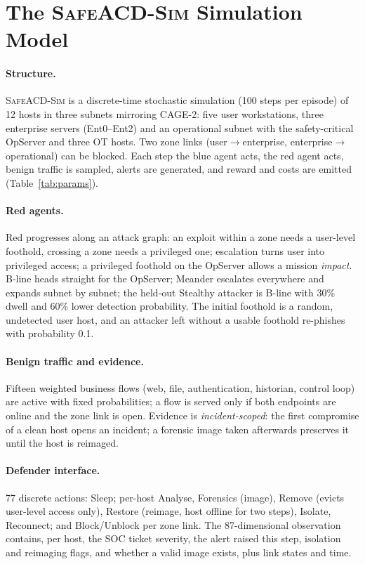 \documentclass[10pt]{article}
\newcommand{\safeacd}{\textsc{SafeACD-Sim}}
\begin{document}
\section{The \safeacd{} Simulation Model}
\paragraph{Structure.}
\safeacd{} is a discrete-time stochastic simulation (100 steps per episode)
of 12 hosts in three subnets mirroring CAGE-2: five user workstations, three
enterprise servers (Ent0--Ent2) and an operational subnet with the
safety-critical OpServer and three OT hosts. Two zone links (user$\to$enterprise,
enterprise$\to$operational) can be blocked. Each step the blue agent acts,
the red agent acts, benign traffic is sampled, alerts are generated, and
reward and costs are emitted (Table~\ref{tab:params}).

\paragraph{Red agents.}
Red progresses along an attack graph: an exploit within a zone needs a
user-level foothold, crossing a zone needs a privileged one; escalation turns
user into privileged access; a privileged foothold on the OpServer allows a
mission \emph{impact}. \textsf{B-line} heads straight for the OpServer;
\textsf{Meander} escalates everywhere and expands subnet by subnet; the
held-out \textsf{Stealthy} attacker is B-line with 30\% dwell and 60\% lower
detection probability. The initial foothold is a random, undetected user host,
and an attacker left without a usable foothold re-phishes with probability 0.1.

\paragraph{Benign traffic and evidence.}
Fifteen weighted business flows (web, file, authentication, historian, control
loop) are active with fixed probabilities; a flow is served only if both
endpoints are online and the zone link is open. Evidence is
\emph{incident-scoped}: the first compromise of a clean host opens an incident;
a forensic image taken afterwards preserves it until the host is reimaged.

\paragraph{Defender interface.}
77 discrete actions: \textsf{Sleep}; per-host \textsf{Analyse},
\textsf{Forensics} (image), \textsf{Remove} (evicts user-level access only),
\textsf{Restore} (reimage, host offline for two steps), \textsf{Isolate},
\textsf{Reconnect}; and \textsf{Block}/\textsf{Unblock} per zone link. The
87-dimensional observation contains, per host, the SOC ticket severity, the
alert raised this step, isolation and reimaging flags, and whether a valid
image exists, plus link states and time.
\end{document}
